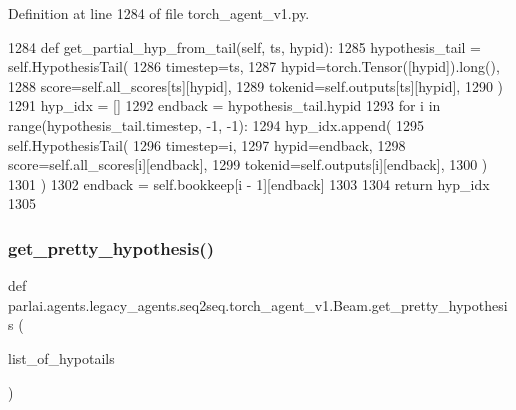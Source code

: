 Definition at line 1284 of file torch\+\_\+agent\+\_\+v1.\+py.


\begin{DoxyCode}
1284     \textcolor{keyword}{def }get\_partial\_hyp\_from\_tail(self, ts, hypid):
1285         hypothesis\_tail = self.HypothesisTail(
1286             timestep=ts,
1287             hypid=torch.Tensor([hypid]).long(),
1288             score=self.all\_scores[ts][hypid],
1289             tokenid=self.outputs[ts][hypid],
1290         )
1291         hyp\_idx = []
1292         endback = hypothesis\_tail.hypid
1293         \textcolor{keywordflow}{for} i \textcolor{keywordflow}{in} range(hypothesis\_tail.timestep, -1, -1):
1294             hyp\_idx.append(
1295                 self.HypothesisTail(
1296                     timestep=i,
1297                     hypid=endback,
1298                     score=self.all\_scores[i][endback],
1299                     tokenid=self.outputs[i][endback],
1300                 )
1301             )
1302             endback = self.bookkeep[i - 1][endback]
1303 
1304         \textcolor{keywordflow}{return} hyp\_idx
1305 
\end{DoxyCode}
\mbox{\label{classparlai_1_1agents_1_1legacy__agents_1_1seq2seq_1_1torch__agent__v1_1_1Beam_afb4e5fd2e6a13e7b64fa00d2336e5e14}} 
\subsubsection{\texorpdfstring{get\+\_\+pretty\+\_\+hypothesis()}{get\_pretty\_hypothesis()}}
{\footnotesize\ttfamily def parlai.\+agents.\+legacy\+\_\+agents.\+seq2seq.\+torch\+\_\+agent\+\_\+v1.\+Beam.\+get\+\_\+pretty\+\_\+hypothesis (\begin{DoxyParamCaption}\item[{}]{list\+\_\+of\+\_\+hypotails }\end{DoxyParamCaption})\hspace{0.3cm}{\ttfamily [static]}}

